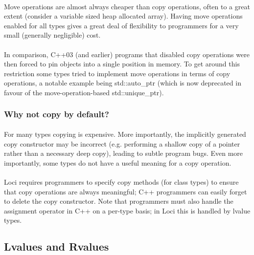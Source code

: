 \documentclass[12pt,twoside,notitlepage]{report}
\begin{document}
\paragraph{}
Move operations are almost always cheaper than copy operations, often to a great extent (consider a variable sized heap allocated array). Having move operations enabled for all types gives a great deal of flexibility to programmers for a very small (generally negligible) cost.

\paragraph{}
In comparison, C++03 (and earlier) programs that disabled copy operations were then forced to pin objects into a single position in memory. To get around this restriction some types tried to implement move operations in terms of copy operations, a notable example being std::auto\_ptr (which is now deprecated in favour of the move-operation-based std::unique\_ptr).

\subsubsection{Why not copy by default?}

\paragraph{}
For many types copying is expensive. More importantly, the implicitly generated copy constructor may be incorrect (e.g. performing a shallow copy of a pointer rather than a necessary deep copy), leading to subtle program bugs. Even more importantly, some types do not have a useful meaning for a copy operation.

\paragraph{}
Loci requires programmers to specify copy methods (for class types) to ensure that copy operations are always meaningful; C++ programmers can easily forget to delete the copy constructor. Note that programmers must also handle the assignment operator in C++ on a per-type basis; in Loci this is handled by lvalue types.

\clearpage

\subsection{Lvalues and Rvalues}
\end{document}
